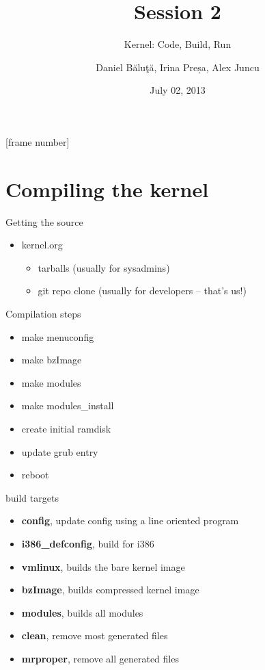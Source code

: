 \documentclass{workshop}
\title[Session 2]{Session 2}
\subtitle{Kernel: Code, Build, Run}
\author{Daniel Băluţă, Irina Preșa, Alex Juncu}
\date{July 02, 2013}
\begin{document}
[frame number]

\frame{\titlepage}


\section{Compiling the kernel}

\begin{frame}{Getting the source}
	\begin{itemize}
		\item kernel.org
		\begin{itemize}
			\item tarballs (usually for sysadmins)
			\item git repo clone (usually for developers -- that's us!)
		\end{itemize}
	\end{itemize}
\end{frame}


\begin{frame}{Compilation steps}
\begin{itemize}
	\item make menuconfig
	\item make bzImage
	\item make modules
	\item make modules_install
	\item create initial ramdisk
	\item update grub entry
	\item reboot
\end{itemize}
\end{frame}

\begin{frame}{build targets}
\begin{itemize}
	\item {\bf config}, update config using a line oriented program
	\item {\bf i386_defconfig}, build for i386
	\item {\bf vmlinux}, builds the bare kernel image
	\item {\bf bzImage}, builds compressed kernel image
	\item {\bf modules}, builds all modules
	\item {\bf clean}, remove most generated files
	\item {\bf mrproper}, remove all generated files
\end{itemize}
\end{frame}
\end{document}
